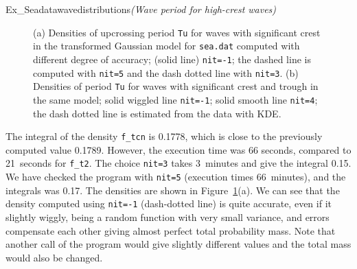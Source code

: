 \begin{cex}{Ex_Seadatawavedistributions}{\sl (Wave period for high-crest waves)}
\begin{figure}[tbh]
%
\hfill
{}
\vspace{-3mm}
  \caption[Densities of period {\tt Tu}]{
(a) Densities of upcrossing period {\tt Tu} for waves with significant crest in
the transformed Gaussian  model
for {\tt sea.dat} computed with different degree of
accuracy; (solid line)  {\tt nit=-1}; the dashed line is
computed with {\tt nit=5} and the dash dotted line with {\tt nit=3}.
(b) Densities of period {\tt Tu} for waves with significant crest and
trough in the same model; solid wiggled line {\tt nit=-1}; solid smooth line
 {\tt nit=4}; the dash dotted line is estimated from
 the data with KDE.
}
 \label{fig74}
\end{figure}
The integral of the density \verb+f_tcn+ is 0.1778,
which is close to the previously computed value 0.1789.
However, the execution time was 66 seconds, compared to
21~seconds for \verb+f_t2+. The choice {\tt nit=3} takes 3~minutes
and give the integral 0.15. We have checked the program with
{\tt nit=5} (execution times 66~minutes), and the integrals was 0.17.
The densities are shown in Figure~\ref{fig74}(a). We can see that
the density computed using {\tt nit=-1} (dash-dotted line) is quite
accurate, even if it slightly
wiggly, being a random function with very small variance, and errors
compensate each other giving almost perfect total probability mass.
Note that another call of the program would give slightly different
values and the total mass would also be changed.
\end{cex}


